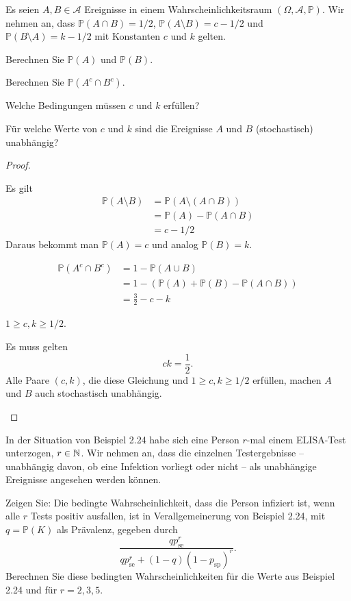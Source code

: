 \begin{Problem}
	Es seien $A,B\in \mathcal{A}$ Ereignisse in einem Wahrscheinlichkeitsraum $(\Omega, \mathcal{A}, \mathbb{P})$. Wir nehmen an, dass $\mathbb{P}(A\cap B)=1 / 2$, $\mathbb{P}(A \setminus B)=c - 1 / 2$ und $\mathbb{P}(B \setminus A)=k - 1 / 2$ mit Konstanten $c$ und $k$ gelten.
	\begin{parts}
	\item Berechnen Sie $\mathbb{P}(A)$ und $\mathbb{P}(B)$.
	\item Berechnen Sie $\mathbb{P}(A^c\cap B^c)$.
	\item Welche Bedingungen m\"{u}ssen $c$ und $k$ erf\"{u}llen?
	\item F\"{u}r welche Werte von $c$ und $k$ sind die Ereignisse $A$ und $B$ (stochastisch) unabhängig?
	\end{parts}
\end{Problem}
\begin{proof}
	\begin{parts}
	\item Es gilt
		\begin{align*}
			\mathbb{P}(A \setminus B) &= \mathbb{P}(A \setminus (A \cap B))\\
			&= \mathbb{P}(A) - \mathbb{P}(A\cap B)\\
			&= c - 1 / 2
		\end{align*}
		Daraus bekommt man $\mathbb{P}(A)=c$ und analog $\mathbb{P}(B)=k$.
	\item 
		\begin{align*}
			\mathbb{P}(A^c \cap B^c) &= 1-\mathbb{P}(A\cup B)\\
			&=1 - (\mathbb{P}(A)+\mathbb{P}(B) - \mathbb{P}(A\cap B))\\
			&= \frac{3}{2}-c-k
		\end{align*}
	\item $1 \ge c,k\ge 1 / 2$.
	\item Es muss gelten
		\[
		ck = \frac{1}{2}
		.\] 
		Alle Paare $(c,k)$, die diese Gleichung und $1 \ge c,k\ge 1 / 2$ erf\"{u}llen, machen $A$ und $B$ auch stochastisch unabh\"{a}ngig.\qedhere
	\end{parts}
\end{proof}
\begin{Problem}
	In der Situation von Beispiel 2.24 habe sich eine Person $r$-mal einem ELISA-Test unterzogen, $r \in \mathbb{N}$. Wir nehmen an, dass die einzelnen Testergebnisse – unabh\"{a}ngig davon, ob eine Infektion vorliegt oder nicht – als unabh\"{a}ngige Ereignisse angesehen werden k\"{o}nnen.

Zeigen Sie: Die bedingte Wahrscheinlichkeit, dass die Person infiziert ist, wenn alle $r$ Tests positiv ausfallen, ist in Verallgemeinerung von Beispiel 2.24, mit $q = \mathbb{P}(K)$ als Pr\"{a}valenz, gegeben durch
\[
\frac{qp_\text{se}^r}{qp_\text{se}^r+(1-q)(1-p_\text{sp})^r}
.\] 
Berechnen Sie diese bedingten Wahrscheinlichkeiten f\"{u}r die Werte aus Beispiel 2.24 und f\"{u}r $r=2,3,5$.
\end{Problem}
